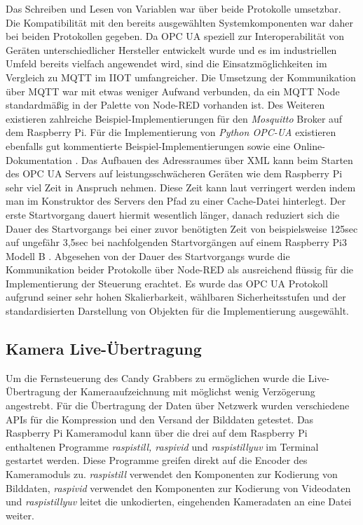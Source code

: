 \documentclass[BMR,Bachelor,ngerman]{twbook}%
\begin{document}
%
\par Das Schreiben und Lesen von Variablen war über beide Protokolle umsetzbar. Die Kompatibilität mit den bereits ausgewählten Systemkomponenten war daher bei beiden Protokollen gegeben. Da \ac{OPC UA} speziell zur Interoperabilität von Geräten unterschiedlicher Hersteller entwickelt wurde und es im industriellen Umfeld bereits vielfach angewendet wird, sind die Einsatzmöglichkeiten im Vergleich zu \ac{MQTT} im \ac{IIOT} umfangreicher. Die Umsetzung der Kommunikation über \ac{MQTT} war mit etwas weniger Aufwand verbunden, da ein \ac{MQTT} Node standardmäßig in der Palette von Node-RED vorhanden ist. Des Weiteren existieren zahlreiche Beispiel-Implementierungen für den \emph{Mosquitto} Broker auf dem Raspberry Pi. Für die Implementierung von \emph{Python OPC-UA} existieren ebenfalls gut kommentierte Beispiel-Implementierungen \cite{pythonopcua2018} sowie eine Online-Dokumentation \cite{doku2015pyopcua}. Das Aufbauen des Adressraumes über \ac{XML} kann beim Starten des \ac{OPC UA} Servers auf leistungsschwächeren Geräten wie dem Raspberry Pi sehr viel Zeit in Anspruch nehmen. Diese Zeit kann laut  verringert werden indem man im Konstruktor des Servers den Pfad zu einer Cache-Datei hinterlegt. Der erste Startvorgang dauert hiermit wesentlich länger, danach reduziert sich die Dauer des Startvorgangs bei einer zuvor benötigten Zeit von beispielsweise 125sec auf ungefähr 3,5sec bei nachfolgenden Startvorgängen auf einem Raspberry Pi3 Modell B \cite{pythonopcua2018}. Abgesehen von der Dauer des Startvorgangs wurde die Kommunikation beider Protokolle über Node-RED als ausreichend flüssig für die Implementierung der Steuerung erachtet. Es wurde das \ac{OPC UA} Protokoll aufgrund seiner sehr hohen Skalierbarkeit, wählbaren Sicherheitsstufen und der standardisierten Darstellung von Objekten für die Implementierung ausgewählt.
\subsection{Kamera Live-Übertragung}
Um die Fernsteuerung des Candy Grabbers zu ermöglichen wurde die Live-Übertragung der Kameraaufzeichnung mit möglichst wenig Verzögerung angestrebt. Für die Übertragung der Daten über Netzwerk wurden verschiedene \acp{API} für die Kompression und den Versand der Bilddaten getestet. Das Raspberry Pi Kameramodul kann über die drei auf dem Raspberry Pi enthaltenen Programme \emph{raspistill, raspivid} und \emph{raspistillyuv} im Terminal gestartet werden. Diese Programme greifen direkt auf die Encoder des Kameramoduls zu. \emph{raspistill} verwendet den Komponenten zur Kodierung von Bilddaten, \emph{raspivid} verwendet den Komponenten zur Kodierung von Videodaten und \emph{raspistillyuv} leitet die unkodierten, eingehenden Kameradaten an eine Datei weiter.
\end{document}
